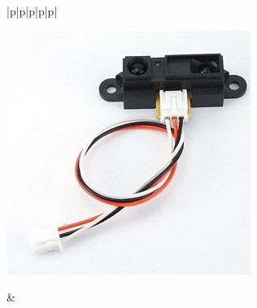 \begin{table}[H]
\begin{tabular}{|p{\colA}|p{\colB}|p{\colC}|p{\colD}|p{\colE}|}
\begin{minipage}[t]{\linewidth}
      \includegraphics[width=0.8\linewidth]{images/chap05/text05-img023.jpg}
      \smallskip
    \end{minipage} &
    \pageref{distance}\\ \hline   
  \end{tabular}
\end{table}

